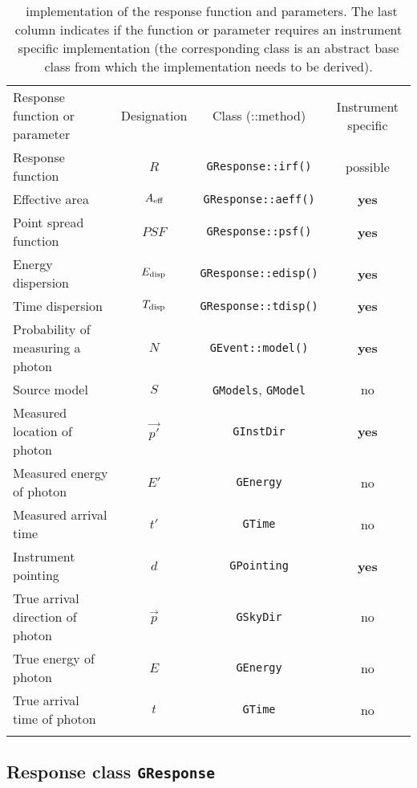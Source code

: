 \documentclass{article}[12pt,a4]
\begin{document}
\begin{table}[!h]
\caption{\this\ implementation of the response function and parameters. 
The last column indicates if the function or parameter requires an
instrument specific implementation (the corresponding class is an abstract base class
from which the implementation needs to be derived).
\label{tab:respar}}
\begin{center}
\begin{tabular}{lccc}
\hline
\hline
\noalign{\smallskip}
Response function or parameter & Designation & Class (::method) & Instrument specific \\
\noalign{\smallskip}
\hline
\noalign{\smallskip}
Response function & $R$ & {\tt GResponse::irf()} & possible \\
Effective area & $A_{\rm eff}$ & {\tt GResponse::aeff()} & {\bf yes} \\
Point spread function & $PSF$ & {\tt GResponse::psf()} & {\bf yes} \\
Energy dispersion & $E_{\rm disp}$ & {\tt GResponse::edisp()} & {\bf yes} \\
Time dispersion & $T_{\rm disp}$ & {\tt GResponse::tdisp()} & {\bf yes} \\
Probability of measuring a photon & $N$ & {\tt GEvent::model()} & {\bf yes} \\
Source model & $S$ & {\tt GModels}, {\tt GModel} & no \\ 
Measured location of photon & $\vec{p'}$ & {\tt GInstDir} & {\bf yes} \\
Measured energy of photon & $E'$ & {\tt GEnergy} & no \\
Measured arrival time & $t'$ & {\tt GTime} & no \\
Instrument pointing & $d$ & {\tt GPointing} & {\bf yes} \\
True arrival direction of photon & $\vec{p}$ & {\tt GSkyDir} & no \\
True energy of photon & $E$ & {\tt GEnergy} & no \\
True arrival time of photon & $t$ & {\tt GTime} & no \\
\noalign{\smallskip}
\hline
\end{tabular}
\end{center}
\end{table}



\subsection{Response class {\tt GResponse}}
\end{document}
